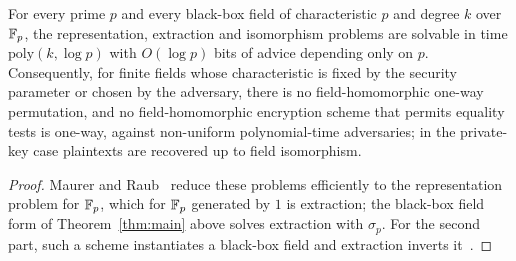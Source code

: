 \begin{corollary}\label{cor:bbf}
For every prime $p$ and every black-box field of characteristic $p$ and degree $k$ over $\mathbb{F}_p$, the
representation, extraction and isomorphism problems are solvable in time $\mathrm{poly}(k,\log p)$ with
$O(\log p)$ bits of advice depending only on $p$. Consequently, for finite fields whose characteristic is fixed
by the security parameter or chosen by the adversary, there is no field-homomorphic one-way permutation, and
no field-homomorphic encryption scheme that permits equality tests is one-way, against non-uniform
polynomial-time adversaries; in the private-key case plaintexts are recovered up to field isomorphism.
\end{corollary}

\begin{proof}
Maurer and Raub~\cite[Thm.~1, Cor.~2--3]{MR07} reduce these problems efficiently to the representation problem
for $\mathbb{F}_p$, which for $\mathbb{F}_p$ generated by $1$ is extraction; the black-box field form of
Theorem~\ref{thm:main} above solves extraction with $\sigma_p$. For the second part, such a scheme
instantiates a black-box field and extraction inverts it~\cite[Cor.~1, \S4]{MR07}.
\end{proof}
